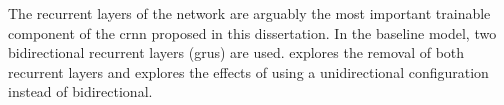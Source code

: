 
The recurrent layers of the network are arguably the most
important trainable component of the \gls{crnn} proposed in
this dissertation. In the baseline model, two bidirectional
recurrent layers (\glspl{gru}) are used.
 explores the removal of
both recurrent layers and
 explores the
effects of using a unidirectional configuration instead of
bidirectional. 
